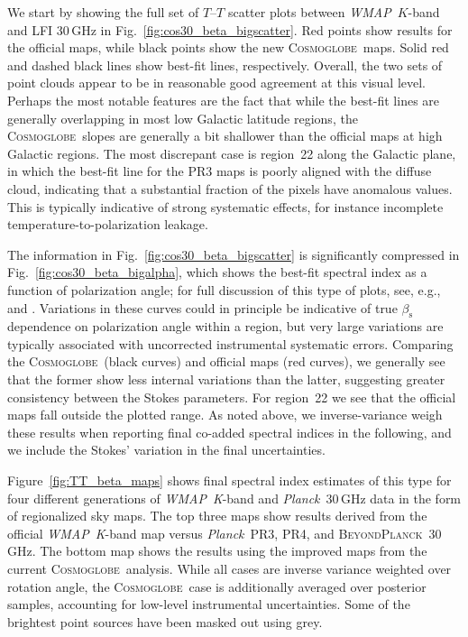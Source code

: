 \documentclass[twocolumn]{../../common/aa}
\def\WMAP{\emph{WMAP}}
\def\Planck{\emph{Planck}}
\newcommand{\bp}{\textsc{BeyondPlanck}}
\newcommand{\cosmoglobe}{\textsc{Cosmoglobe}}
\newcommand{\K}[0]{\textit K}
\begin{document}
We start by showing the full set of $T$--$T$ scatter plots between \WMAP\ $K$-band and LFI 30\,GHz in Fig.~\ref{fig:cos30_beta_bigscatter}. Red points show results for the official maps, while black points show the new \cosmoglobe\ maps. Solid red and dashed black lines show best-fit lines, respectively. Overall, the two sets of point clouds appear to be in reasonable good agreement at this visual level. Perhaps the most notable features are the fact that while the best-fit lines are generally overlapping in most low Galactic latitude regions, the \cosmoglobe\ slopes are generally a bit shallower than the official maps at high Galactic regions. The most discrepant case is region~22 along the Galactic plane, in which the best-fit line for the PR3 maps is poorly aligned with the diffuse cloud, indicating that a substantial fraction of the pixels have anomalous values. This is typically indicative of strong systematic effects, for instance incomplete temperature-to-polarization leakage.

The information in Fig.~\ref{fig:cos30_beta_bigscatter} is significantly compressed in Fig.~\ref{fig:cos30_beta_bigalpha}, which shows the best-fit spectral index as a function of polarization angle; for full discussion of this type of plots, see, e.g., \citet{wehus:2013} and \citet{fuskeland:2019}. Variations in these curves could in principle be indicative of true $\beta_\mathrm s$ dependence on polarization angle within a region, but very large variations are typically associated with uncorrected instrumental systematic errors. Comparing the \cosmoglobe\ (black curves) and official maps (red curves), we generally see that the former show less internal variations than the latter, suggesting greater consistency between the Stokes parameters. For region~22 we see that the official maps fall outside the plotted range. As noted above, we inverse-variance weigh these results when reporting final co-added spectral indices in the following, and we include the Stokes' variation in the final uncertainties.

Figure~\ref{fig:TT_beta_maps} shows final spectral index estimates of this type for four different generations of \WMAP\ \K-band and \Planck\ 30\,GHz data in the form of regionalized sky maps. The top three maps show results derived from the official \WMAP\ \K-band map versus \Planck\ PR3, PR4, and \bp\ 30\,GHz. The bottom map shows the results using the improved maps from the current \cosmoglobe\ analysis. While all cases are inverse variance weighted over rotation angle, the \cosmoglobe\ case is additionally averaged over posterior samples, accounting for low-level instrumental uncertainties. Some of the brightest point sources have been masked out using grey.
\end{document}

